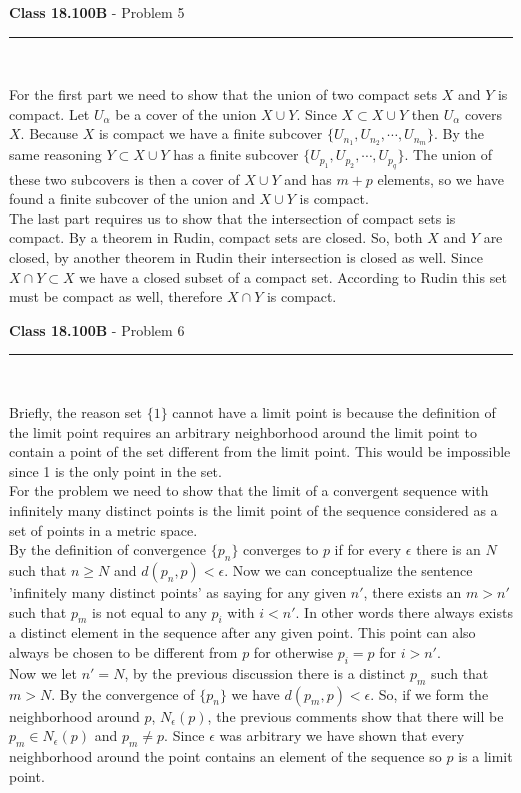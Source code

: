\documentclass[11pt,reqno]{article}
\begin{document}
\vspace{15pt}
\begin{flushleft} 
\textbf{Class 18.100B} - Problem 5\\
\rule{500pt}{1pt}\\
\end{flushleft} 

For the first part we need to show that the union of two compact sets $X$ and $Y$ is compact. Let $U_{\alpha}$ be a cover of the union $X \cup Y$. Since $X \subset X \cup Y$ then $U_{\alpha}$ covers $X$. Because $X$ is compact we have a finite subcover $\{ U_{n_1}, U_{n_2}, \cdots, U_{n_m} \}$. By the same reasoning $Y \subset X \cup Y$ has a finite subcover $\{ U_{p_1}, U_{p_2}, \cdots, U_{p_q} \}$. The union of these two subcovers is then a cover of $X \cup Y$ and has $m + p$ elements, so we have found a finite subcover of the union and $X \cup Y$ is compact.\\
\indent The last part requires us to show that the intersection of compact sets is compact. By a theorem in Rudin, compact sets are closed. So, both $X$ and $Y$ are closed, by another theorem in Rudin their intersection is closed as well. Since $X \cap Y \subset X$ we have a closed subset of a compact set. According to Rudin this set must be compact as well, therefore $X \cap Y$ is compact.

\vspace{15pt}
\begin{flushleft} 
\textbf{Class 18.100B} - Problem 6\\
\rule{500pt}{1pt}\\
\end{flushleft} 

Briefly, the reason set $\{ 1 \}$ cannot have a limit point is because the definition of the limit point requires an arbitrary neighborhood around the limit point to contain a point of the set different from the limit point. This would be impossible since 1 is the only point in the set.\\
\indent For the problem we need to show that the limit of a convergent sequence with infinitely many distinct points is the limit point of the sequence considered as a set of points in a metric space. \\
\indent By the definition of convergence $ \{ p_n \}$ converges to $p$ if for every $\epsilon$ there is an $N$ such that $n \ge N$ and $d(p_n,p) < \epsilon$. Now we can conceptualize the sentence 'infinitely many distinct points' as saying for any given $n'$, there exists an $m > n'$ such that $p_m$ is not equal to any $p_i$ with $i < n'$. In other words there always exists a distinct element in the sequence after any given point. This point can also always be chosen to be different from $p$ for otherwise $p_i = p$ for $i > n'$. \\
\indent Now we let $n' = N$, by the previous discussion there is a distinct $p_m$ such that $m > N$. By the convergence of $\{ p_n \}$ we have $d(p_m,p) < \epsilon$. So, if we form the neighborhood around $p$, $N_\epsilon(p)$,  the previous comments show that there will be $p_m \in N_\epsilon(p)$ and $p_m \neq p$. Since $\epsilon$ was arbitrary we have shown that every neighborhood around the point contains an element of the sequence so $p$ is a limit point.
\end{document}
